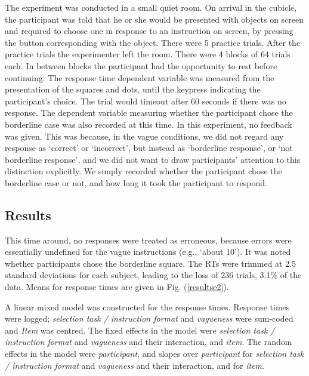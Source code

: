 \documentclass[
a4paper 
, doc
, longtable
]{apa6}
\begin{document}
The experiment was conducted in a small quiet room.
On arrival in the cubicle, the participant was told that he or she would be presented with objects on screen and required to choose one in response to an instruction on screen, by pressing the button corresponding with the object. There were 5 practice trials. After the practice trials the experimenter left the room. There were 4 blocks of 64 trials each. In between blocks the participant had the opportunity to rest before continuing. The response time dependent variable was measured from the presentation of the squares and dots, until the keypress indicating the participant's choice. The trial would timeout after 60 seconds if there was no response. The dependent variable measuring whether the participant chose the borderline case was also recorded at this time. In this experiment, no feedback was given. This was because, in the vague conditions, we did not regard any response as `correct' or `incorrect', but instead as `borderline response', or `not borderline response', and we did not want to draw participants' attention to this distinction explicitly. We simply recorded whether the participant chose the borderline case or not, and how long it took the participant to respond.

\subsection{Results}

This time around, no responses were treated as erroneous, because errors were essentially undefined for the vague instructions (e.g., `about 10'). It was noted whether participants chose the borderline square. 
%
The RTs were trimmed at 2.5 standard deviations for each subject, leading to the loss of 236 trials, 3.1\% of the data. Means for response times are given in Fig. (\ref{resultse2}).

A linear mixed model was constructed for the response times.
%
Response times were logged; \emph{selection task / instruction format} and \emph{vagueness} were sum-coded and \emph{Item} was centred. 
% 
The fixed effects in the model were \emph{selection task / instruction format} and \emph{vagueness} and their interaction, and \emph{item}.
% 
The random effects in the model were \emph{participant}, and slopes over \emph{participant} for \emph{selection task / instruction format} and \emph{vagueness} and their interaction, and for \emph{item}.
\end{document}
